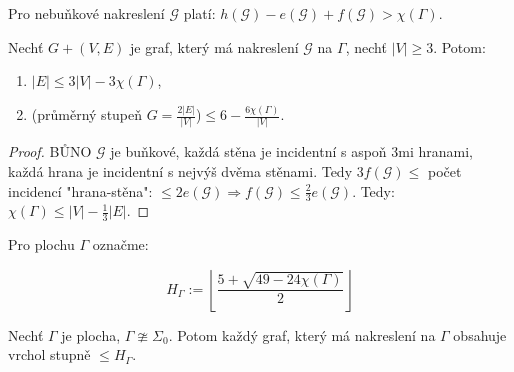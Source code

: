 \begin{fakt}
	Pro nebuňkové nakreslení $\mathcal{G}$ platí: $h(\mathcal{G}) - e(\mathcal{G}) + f(\mathcal{G}) > \chi(\Gamma)$.
\end{fakt}

\begin{dusl}
	Nechť $G+(V,E)$ je graf, který má nakreslení $\mathcal{G}$ na $\Gamma$, nechť $|V| \geq 3$. Potom:
	
	\begin{enumerate}
		\item $|E| \leq 3 |V| - 3 \chi (\Gamma)$,
		\item (průměrný stupeň $G = \frac{2|E|}{|V|}$)$\leq 6 - \frac{6 \chi(\Gamma)}{|V|}$.
	\end{enumerate}
\end{dusl}

\begin{proof}
	BŮNO $\mathcal{G}$ je buňkové, každá stěna je incidentní s aspoň 3mi hranami, každá hrana je incidentní s nejvýš dvěma stěnami. Tedy $3 f(\mathcal{G}) \leq$ počet incidencí "hrana-stěna": $\leq 2 e(\mathcal{G}) \Rightarrow f(\mathcal{G}) \leq \frac{2}{3} e(\mathcal{G})$. Tedy: $\chi(\Gamma) \leq |V| - \frac{1}{3}|E|$.
\end{proof}

\begin{definice}
	Pro plochu $\Gamma$ označme:
	
	$$
	H_{\Gamma} := \left\lfloor \frac{5+\sqrt{49-24 \chi(\Gamma)}}{2} \right\rfloor
	$$
\end{definice}

\begin{veta}
	Nechť $\Gamma$ je plocha, $\Gamma \ncong \Sigma_{0}$. Potom každý graf, který má nakreslení na $\Gamma$ obsahuje vrchol stupně $\leq H_{\Gamma}$.
\end{veta}

